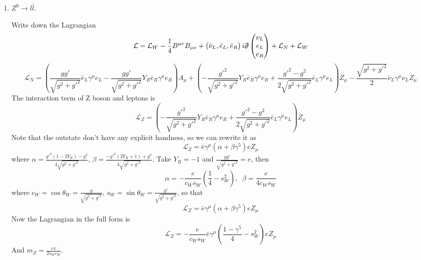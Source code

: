 \documentclass{article}
\newcommand{\gm}{\gamma^{\mu}}
\newcommand{\g}{\gamma}
\renewcommand{\a}{\alpha}
\renewcommand{\b}{\beta}
\newcommand{\lag}{\mathcal{L}}
\newcommand{\da}{^{\dagger}}
\newcommand{\sm}{^{\mu}}
\newcommand{\Dm}{D^{\mu}}
\begin{document}
\begin{enumerate}[\bf 1.]
%

	\item $Z^0\rightarrow l\bar l$.

  Write down the Lagrangian
   $$\lag=\lag_W-\frac{1}{4}B^{\mu\nu}B_{\mu\nu}+\pmqty{\bar \nu_L,\bar e_L,\bar e_R}i\slashed \partial\pmqty{\nu_L\\e_L\\e_R}+\lag_N+\lag_W$$
   $$\lag_N=(\frac{gg'}{\sqrt{g^2+g'^2}}\bar e_L\gm e_L-\frac{gg'}{\sqrt{g^2+g'^2}}Y_R\bar e_R\gm e_R) A_{\mu}+(-\frac{g'^2}{\sqrt{g^2+g'^2}}Y_R\bar e_R\gm e_R+\frac{g'^2-g^2}{2\sqrt{g^2+g'^2}}\bar e_L\gm e_L)Z_{\mu}-\frac{\sqrt{g^2+g'^2}}{2}\bar \nu_L\gm\nu_L Z_{\mu}$$
   The interaction term of Z boson and leptons is
   $$\lag_Z= (-\frac{g'^2}{\sqrt{g^2+g'^2}}Y_R\bar e_R\gm e_R+\frac{g'^2-g^2}{2\sqrt{g^2+g'^2}}\bar e_L\gm e_L)Z_{\mu}$$
   Note that the outstate don't have any explicit handness, so we can rewrite it as
   $$\lag_Z=\bar e \gm(\a+\b\g^5) e Z_{\mu}$$
   where $\a=\frac{g'^2(1-2Y_R)-g^2}{4\sqrt{g^2+g'^2}}$, $\b=\frac{-g'^2(2Y_R+1)+g^2}{4\sqrt{g^2+g'^2}}$. Take $Y_R=-1$ and $\frac{gg'}{\sqrt{g^2+g'^2}}=e$, then
  $$\a=-\frac{e}{c_Ws_W}(\frac{1}{4}-s_W^2),\;\;\b=\frac{e}{4c_Ws_W}$$
  where $c_W=\cos{\theta_W}=\frac{g}{\sqrt{g^2+g'^2}}$, $s_W=\sin{\theta_W}=\frac{g'}{\sqrt{g^2+g'^2}}$,
  so that
  $$\lag_Z=\bar e\gm(\a+\b\g^5)eZ_{\mu}$$
  Now the Lagrangian in the full form is
  $$\lag_Z=-\frac{e}{c_Ws_W}\bar e\gm(\frac{1-\g^5}{4}-s_W^2)eZ_{\mu}$$
   And $m_Z=\frac{ev}{2s_Wc_W}$.


\end{enumerate}
\end{document}

